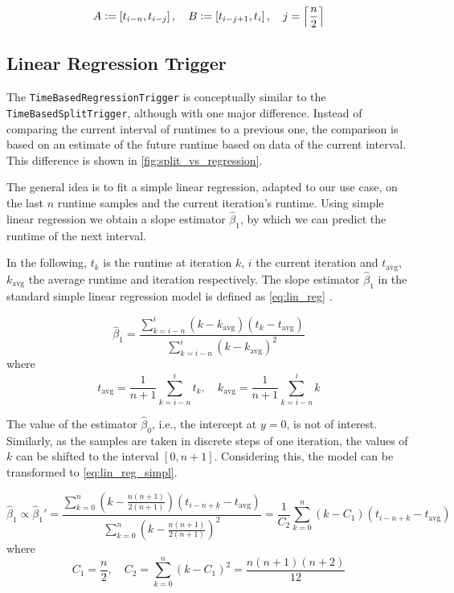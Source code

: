 \begin{equation}
	A \vcentcolon= \left[t_{i-n}, t_{i-j}\right],\quad B\vcentcolon= \left[t_{i-j+1},t_i\right],\quad j=\left\lceil\frac{n}{2}\right\rceil\label{eq:split_intervals}
\end{equation}



\subsection{Linear Regression Trigger}
The \texttt{TimeBasedRegressionTrigger} is conceptually similar to the \texttt{TimeBasedSplitTrigger}, although with one major difference. Instead of comparing the current interval of runtimes to a previous one, the comparison is based on an estimate of the future runtime based on data of the current interval. This difference is shown in \autoref{fig:split_vs_regression}.

The general idea is to fit a simple linear regression, adapted to our use case, on the last $n$ runtime samples and the current iteration's runtime. Using simple linear regression we obtain a slope estimator $\hat{\beta}_1$, by which we can predict the runtime of the next interval.

In the following, $t_k$ is the runtime at iteration $k$, $i$ the current iteration and $t_{\text{avg}}$, $k_{\text{avg}}$ the average runtime and iteration respectively. The slope estimator $\hat{\beta}_1$ in the standard simple linear regression model is defined as \eqref{eq:lin_reg} \cite{Abraham2006}.


\begin{equation}
	\hat{\beta}_1=\frac{\sum_{k=i-n}^{i}(k-k_{\text{avg}})(t_k-t_{\text{avg}})}{\sum_{k=i-n}^{i}(k-k_{\text{avg}})^2}\label{eq:lin_reg}
\end{equation}
where
\begin{equation}
	t_{\text{avg}}=\frac{1}{n+1}\sum_{k=i-n}^it_k, \quad k_{\text{avg}} = \frac{1}{n+1}\sum_{k=i-n}^ik\label{eq:lin_rev_avgs}
\end{equation}

The value of the estimator $\hat\beta_0$, i.e., the intercept at $y=0$, is not of interest. Similarly, as the samples are taken in discrete steps of one iteration, the values of $k$ can be shifted to the interval $\left[0, n+1\right]$. Considering this, the model can be transformed to \eqref{eq:lin_reg_simpl}.

\begin{equation}
	\hat{\beta}_1\propto\hat{\beta}_1' =\frac{\sum_{k=0}^{n}\left(k-\frac{n(n+1)}{2(n+1)}\right)(t_{i-n+k}-t_{\text{avg}})}{\sum_{k=0}^{n}\left(k-\frac{n(n+1)}{2(n+1)}\right)^2}= \frac{1}{C_2}\sum_{k=0}^{n}\left(k-C_1\right)(t_{i-n+k}-t_{\text{avg}})\label{eq:lin_reg_simpl}
\end{equation}
where
\begin{equation}
	C_1 = \frac{n}{2}, \quad C_2=\sum_{k=0}^{n}\left(k-C_1\right)^2=\frac{n(n+1)(n+2)}{12}\label{eq:lin_reg_consts}
\end{equation}


